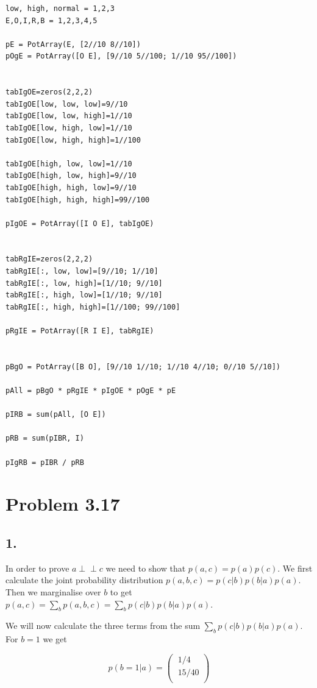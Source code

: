 \documentclass[11pt,a4paper,oneside]{report}
\newcommand\ci{\perp\!\!\!\perp} %
\begin{document}
\begin{lstlisting}
low, high, normal = 1,2,3
E,O,I,R,B = 1,2,3,4,5

pE = PotArray(E, [2//10 8//10])
pOgE = PotArray([O E], [9//10 5//100; 1//10 95//100])


tabIgOE=zeros(2,2,2)
tabIgOE[low, low, low]=9//10
tabIgOE[low, low, high]=1//10
tabIgOE[low, high, low]=1//10
tabIgOE[low, high, high]=1//100

tabIgOE[high, low, low]=1//10
tabIgOE[high, low, high]=9//10
tabIgOE[high, high, low]=9//10
tabIgOE[high, high, high]=99//100

pIgOE = PotArray([I O E], tabIgOE)


tabRgIE=zeros(2,2,2)
tabRgIE[:, low, low]=[9//10; 1//10]
tabRgIE[:, low, high]=[1//10; 9//10]
tabRgIE[:, high, low]=[1//10; 9//10]
tabRgIE[:, high, high]=[1//100; 99//100]

pRgIE = PotArray([R I E], tabRgIE)


pBgO = PotArray([B O], [9//10 1//10; 1//10 4//10; 0//10 5//10])

pAll = pBgO * pRgIE * pIgOE * pOgE * pE

pIRB = sum(pAll, [O E])

pRB = sum(pIBR, I)

pIgRB = pIBR / pRB

\end{lstlisting}


\section*{Problem 3.17}

\subsection*{1.}

In order to prove $a \ci c$ we need to show that $p(a,c) = p(a)p(c)$. We first 
calculate the joint probability distribution $p(a,b,c) = p(c|b)p(b|a)p(a)$. 
Then 
we marginalise over $b$ to get $p(a,c)=\sum_{b} p(a,b,c) = \sum_{b} 
p(c|b)p(b|a)p(a)$. 

We will now calculate the three terms from the sum $\sum_{b} 
p(c|b)p(b|a)p(a)$. For $b=1$ we get 


\begin{equation}
\label{317A}
p(b = 1|a) =  
  \begin{pmatrix}
   \ 1/4 \\[0.4em]
   \ 15/40 \\
 \end{pmatrix}
\end{equation}
\end{document}
